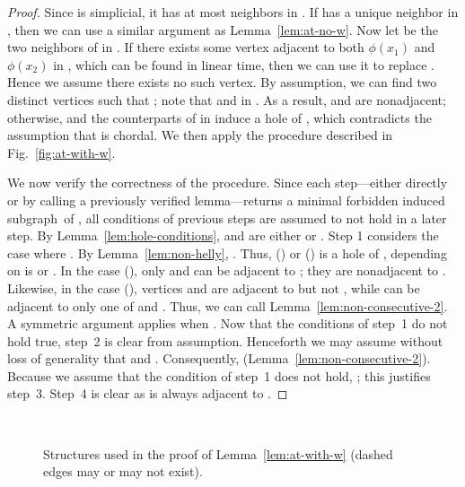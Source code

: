 \documentclass[10pt]{article}
\newcommand{\badgraph}{minimal forbidden induced subgraph}
\newcommand{\og}[1]{\ensuremath{\phi(#1)}}
\begin{document}
\begin{proof}
  Since  is simplicial, it has at most  neighbors in .  If
   has a unique neighbor in , then we can use a similar argument
  as Lemma~\ref{lem:at-no-w}.  Now let  be the two
  neighbors of  in .  If there exists some vertex  adjacent to both {\og{x_1}} and \og{x_2} in ,
  which can be found in linear time, then we can use it to replace .
  Hence we assume there exists no such vertex.  By assumption, we can
  find two distinct vertices  such that
  ; note that  and  in .  As a result,  and
   are nonadjacent; otherwise,  and the
  counterparts of  in  induce a hole of ,
  which contradicts the assumption that  is chordal.  We then
  apply the procedure described in Fig.~\ref{fig:at-with-w}.

  We now verify the correctness of the procedure.  Since each
  step---either directly or by calling a previously verified
  lemma---returns a \badgraph\ of , all conditions of previous
  steps are assumed to not hold in a later step.  By
  Lemma~\ref{lem:hole-conditions},  and
   are either  or .  Step 1 considers the case
  where .  By
  Lemma~\ref{lem:non-helly}, .  Thus,
  () or () is
  a hole of , depending on  is  or .  In
  the case (), only  and 
  can be adjacent to ; they are nonadjacent to .
  Likewise, in the case (), vertices
   and  are adjacent to  but not , while
   can be adjacent to only one of  and .  Thus, we
  can call Lemma~\ref{lem:non-consecutive-2}.  A symmetric argument
  applies when .  Now that the
  conditions of step~1 do not hold true, step~2 is clear from
  assumption.  Henceforth we may assume without loss of generality
  that  and .  Consequently,
   (Lemma~\ref{lem:non-consecutive-2}).
  Because we assume that the condition of step~1 does not hold,
  ; this justifies step~3.  Step~4 is clear as 
  is always adjacent to .
  \end{proof}
\begin{figure}[h!]
  \centering
  \,
  \,
\caption{Structures used in the proof of Lemma~\ref{lem:at-with-w}
  (dashed edges may or may not exist).}
  \label{fig:negative-certificate-2}
\end{figure}
\end{document}
